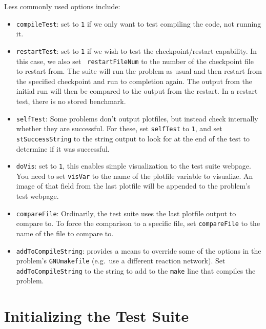 Less commonly used options include:
\begin{itemize}
\item {\tt compileTest}: set to {\tt 1} if we only want to test compiling
  the code, not running it.

\item {\tt restartTest}: set to {\tt 1} if we wish to test the
  checkpoint/restart capability.  In this case, we also set {\tt
    restartFileNum} to the number of the checkpoint file to restart
  from.  The suite will run the problem as usual and then restart from
  the specified checkpoint and run to completion again.  The output
  from the initial run will then be compared to the output from the
  restart.  In a restart test, there is no stored benchmark.

\item {\tt selfTest}: Some problems don't output plotfiles, but
  instead check internally whether they are successful.  For these,
  set {\tt selfTest} to {\tt 1}, and set {\tt stSuccessString} to the
  string output to look for at the end of the test to determine if it
  was successful.

\item {\tt doVis}: set to {\tt 1}, this enables simple visualization
  to the test suite webpage.  You need to set {\tt visVar} to the name
  of the plotfile variable to visualize.  An image of that field from
  the last plotfile will be appended to the problem's test webpage.
  
\item {\tt compareFile}: Ordinarily, the test suite uses the last
  plotfile output to compare to.  To force the comparison to a
  specific file, set {\tt compareFile} to the name of the file to
  compare to.

\item {\tt addToCompileString}: provides a means to override some of
  the options in the problem's {\tt GNUmakefile} (e.g.\ use a
  different reaction network).  Set {\tt addToCompileString} to the
  string to add to the {\tt make} line that compiles the problem.
\end{itemize}



\section{Initializing the Test Suite}

